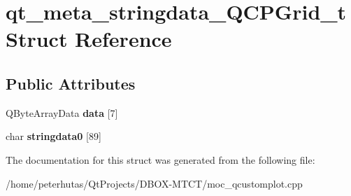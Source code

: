\hypertarget{structqt__meta__stringdata___q_c_p_grid__t}{}\section{qt\+\_\+meta\+\_\+stringdata\+\_\+\+Q\+C\+P\+Grid\+\_\+t Struct Reference}
\label{structqt__meta__stringdata___q_c_p_grid__t}
\subsection*{Public Attributes}
\begin{DoxyCompactItemize}
\item 
\mbox{\label{structqt__meta__stringdata___q_c_p_grid__t_ad7520be1ee34a662890da1cb1384cf28}} 
Q\+Byte\+Array\+Data {\bfseries data} \mbox{[}7\mbox{]}
\item 
\mbox{\label{structqt__meta__stringdata___q_c_p_grid__t_a125926539385574413c9ff82323a34ca}} 
char {\bfseries stringdata0} \mbox{[}89\mbox{]}
\end{DoxyCompactItemize}


The documentation for this struct was generated from the following file\+:\begin{DoxyCompactItemize}
\item 
/home/peterhutas/\+Qt\+Projects/\+D\+B\+O\+X-\/\+M\+T\+C\+T/moc\+\_\+qcustomplot.\+cpp\end{DoxyCompactItemize}
